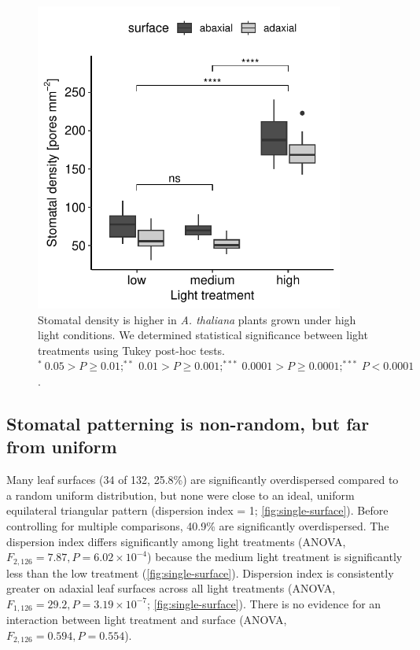 \documentclass[webpdf,large,modern,unnumsec,namedate]{oup-authoring-template}
\begin{document}
\begin{figure}[ht]
\includegraphics[width = 4in]{figures/density.pdf}
\caption{Stomatal density is higher in \textit{A. thaliana} plants grown under high light conditions. We determined statistical significance between light treatments using Tukey post-hoc tests. $^*~0.05 > P \ge 0.01; ^{**}~0.01 > P \ge 0.001; ^{***}~0.0001 > P \ge 0.0001; ^{***}~ P <0.0001$.}
\label{fig:density}
\end{figure}

\subsection{Stomatal patterning is non-random, but far from
uniform}\label{stomatal-patterning-is-non-random-but-far-from-uniform}

Many leaf surfaces (34 of 132, 25.8\%) are significantly overdispersed
compared to a random uniform distribution, but none were close to an
ideal, uniform equilateral triangular pattern (dispersion index = 1;
\autoref{fig:single-surface}). Before controlling for multiple
comparisons, 40.9\% are significantly overdispersed. The dispersion
index differs significantly among light treatments (ANOVA,
\(F_{2,126} = 7.87, P = 6.02 \times 10^{-4}\)) because the medium light
treatment is significantly less than the low treatment
(\autoref{fig:single-surface}). Dispersion index is consistently greater
on adaxial leaf surfaces across all light treatments (ANOVA,
\(F_{1,126} = 29.2, P = 3.19 \times 10^{-7}\);
\autoref{fig:single-surface}). There is no evidence for an interaction
between light treatment and surface (ANOVA,
\(F_{2,126} = 0.594, P = 0.554\)).
\end{document}
